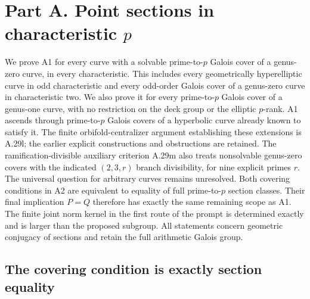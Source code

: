 \section{Part A. Point sections in characteristic \texorpdfstring{$p$}{p}}
\label{sec:partA}

We prove A1 for every curve with a solvable prime-to-$p$ Galois
cover of a genus-zero curve, in every characteristic. This includes
every geometrically hyperelliptic curve in odd characteristic and
every odd-order Galois cover of a genus-zero curve in characteristic
two. We also prove it for every prime-to-$p$ Galois cover of a
genus-one curve, with no restriction on the deck group or the
elliptic $p$-rank. A1 ascends through prime-to-$p$ Galois covers
of a hyperbolic curve already known to satisfy it. The finite
orbifold-centralizer argument establishing these extensions is
A.29l; the earlier explicit constructions and obstructions are
retained. The ramification-divisible auxiliary criterion A.29m
also treats nonsolvable genus-zero covers with the indicated
$(2,3,r)$ branch divisibility, for nine explicit primes $r$.
The universal question for arbitrary curves remains
unresolved. Both covering conditions in A2 are
equivalent to equality of full prime-to-$p$ section classes. Their final
implication $P=Q$ therefore has exactly the same remaining scope as A1.
The finite joint norm kernel in the first route of the prompt is
determined exactly and is larger than the proposed subgroup. All
statements concern geometric conjugacy of sections and retain the full
arithmetic Galois group.

\subsection{The covering condition is exactly section equality}

